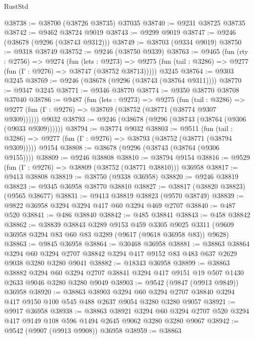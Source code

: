 \begin{lexlean}{RustStd}
\begin{coremodule}
@38738 := @38700 (@38726 @38735) @37035
@38740 := @9231 @38725 @38735
@38742 := @9462 @38724 @9019
@38743 := @9299 @9019
@38747 := @9246 (@38678 (@9296 (@38743 @9312)))
@38749 := @38703 (@9334 @9019)
@38750 := @9318 @38749
@38752 := @9246 (@38750 @9339)
@38763 := @9465
    (fun (rty : @2756) =>
    @9274
      (fun (lets : @9273) =>
      @9275 (fun (tail : @3286) => @9277 (fun (Γ : @9276) => @38747 (@38752 @38713)))))
    @3245
@38764 := @9303 @3245
@38769 := @9246 (@38678 (@9296 (@38743 (@38764 @9311))))
@38770 := @9347 @3245
@38771 := @9346 @38770
@38774 := @9350 @38770 @38708 @37040
@38786 := @9487
    (fun (lets : @9273) =>
    @9275
      (fun (tail : @3286) =>
      @9277 (fun (Γ : @9276) => @38769 (@38752 (@38771 (@38774 @9307 @9309))))))
    @9032
@38793 := @9246 (@38678 (@9296 (@38743 (@38764 (@9306 (@9033 @9309))))))
@38794 := @38774 @9032
@38803 := @9511
    (fun (tail : @3286) => @9277 (fun (Γ : @9276) => @38793 (@38752 (@38771 (@38794 @9309)))))
    @9154
@38808 := @38678 (@9296 (@38743 (@38764 (@9306 @9155))))
@38809 := @9246 @38808
@38810 := @38794 @9154
@38816 := @9529 (fun (Γ : @9276) => @38809 (@38752 (@38771 @38810))) @36958
@38817 := @9413 @38808
@38819 := @38750 (@9338 @36958)
@38820 := @9246 @38819
@38823 := @9345 @36958 @38770 @38810
@38827 := @38817 (@38820 @38823) (@9565 @38677)
@38831 := @9413 @38819 @38823 (@9570 @38749)
@38839 := @9822 @36958 @3294 @3294 @417 @60 @3294 @469 @2707
@38840 := @487 @520
@38841 := @486 @38840
@38842 := @485 @38841
@38843 := @458 @38842
@38862 := @38839
    @38843
    @3289
    @9153
    @459
    @3305
    @9025
    @3311
    (@9609 @36958 @3294 @83 @60 @83 @3289 (@9617 (@9618 @36958 @83)) @9628)
@38863 := @9845 @36958
@38864 := @30468 @36958
@38881 := @38863
    @38864
    @3294
    @60
    @3294
    @2707
    @38842
    @3294
    @417
    @9152
    @83
    @483
    @637
    @2629
    @9038
    @3280
    @3280
    @9041
@38882 := @18343 @36958
@38899 := @38863
    @38882
    @3294
    @60
    @3294
    @2707
    @38841
    @3294
    @417
    @9151
    @19
    @507
    @1430
    @2633
    @9046
    @3280
    @3280
    @9049
@38903 := @9542 (@9847 (@9913 @9849)) @36958
@38920 := @38863
    @38903
    @3294
    @60
    @3294
    @2707
    @38840
    @3294
    @417
    @9150
    @100
    @545
    @488
    @2637
    @9054
    @3280
    @3280
    @9057
@38921 := @9917 @36958
@38938 := @38863
    @38921
    @3294
    @60
    @3294
    @2707
    @520
    @3294
    @417
    @9149
    @108
    @596
    @1494
    @2645
    @9062
    @3280
    @3280
    @9067
@38942 := @9542 (@9907 (@9913 @9908)) @36958
@38959 := @38863

\end{coremodule}
\end{lexlean}
